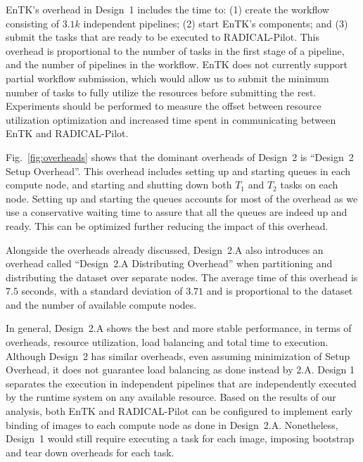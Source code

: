 EnTK's overhead in Design~1 includes the time to: (1) create the workflow consisting of $3.1k$ independent pipelines; (2) start EnTK's components; and (3) submit the tasks that are ready to be executed to RADICAL-Pilot. 
This overhead is proportional to the number of tasks in the first stage of a pipeline, and the number of pipelines in the workflow.
EnTK does not currently support partial workflow submission, which would allow us to submit the minimum number of tasks to fully utilize the resources before submitting the rest.
Experiments should be performed to measure the offset between resource utilization optimization and increased time spent in communicating between EnTK and RADICAL-Pilot.

Fig.~\ref{fig:overheads} shows that the dominant overheads of Design~2 is ``Design~2 Setup Overhead''.
This overhead includes setting up and starting queues in each compute node, and starting and shutting down both $T_{1}$ and $T_{2}$ tasks on each node.
Setting up and starting the queues accounts for most of the overhead as we use a conservative waiting time to assure that all the queues are indeed up and ready.
This can be optimized further reducing the impact of this overhead.

Alongside the overheads already discussed, Design~2.A also introduces an overhead called ``Design~2.A Distributing Overhead'' when partitioning and distributing the dataset over separate nodes.
The average time of this overhead is $7.5$ seconds, with a standard deviation of $3.71$ and is proportional to the dataset and the number of available compute nodes.

In general, Design~2.A shows the best and more stable performance, in terms of overheads, resource utilization, load balancing and total time to execution.
Although Design~2 has similar overheads, even assuming minimization of Setup Overhead, it does not guarantee load balancing as done instead by 2.A.
Design 1 separates the execution in independent pipelines that are independently executed by the runtime system on any available resource.
Based on the results of our analysis, both EnTK and RADICAL-Pilot can be configured to implement early binding of images to each compute node as done in Design~2.A.
Nonetheless, Design~1 would still require executing a task for each image, imposing bootstrap and tear down overheads for each task.
